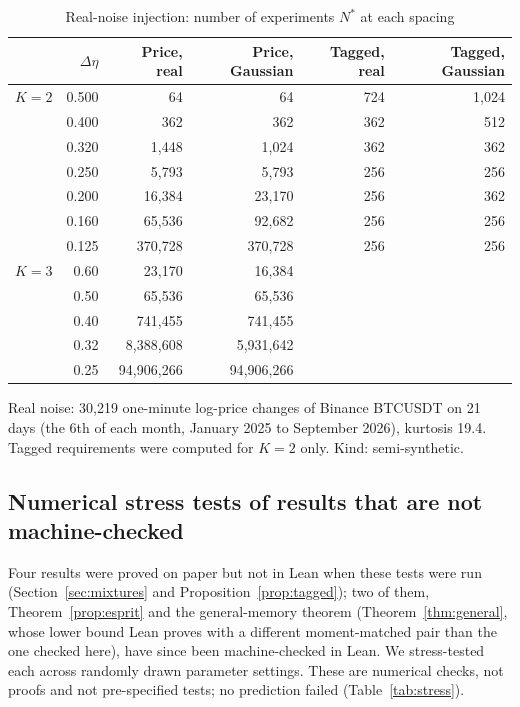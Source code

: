 \begin{table}[!htbp]\centering\small
\begin{threeparttable}
\caption{Real-noise injection: number of experiments $N^*$ at each spacing}\label{tab:injectionfull}
\begin{tabular}{lrrrrr}
\toprule
 & $\Delta\eta$ & Price, real & Price, Gaussian & Tagged, real & Tagged, Gaussian\\
\midrule
$K=2$ & 0.500 & 64 & 64 & 724 & 1{,}024\\
 & 0.400 & 362 & 362 & 362 & 512\\
 & 0.320 & 1{,}448 & 1{,}024 & 362 & 362\\
 & 0.250 & 5{,}793 & 5{,}793 & 256 & 256\\
 & 0.200 & 16{,}384 & 23{,}170 & 256 & 362\\
 & 0.160 & 65{,}536 & 92{,}682 & 256 & 256\\
 & 0.125 & 370{,}728 & 370{,}728 & 256 & 256\\
\midrule
$K=3$ & 0.60 & 23{,}170 & 16{,}384 & & \\
 & 0.50 & 65{,}536 & 65{,}536 & & \\
 & 0.40 & 741{,}455 & 741{,}455 & & \\
 & 0.32 & 8{,}388{,}608 & 5{,}931{,}642 & & \\
 & 0.25 & 94{,}906{,}266 & 94{,}906{,}266 & & \\
\bottomrule
\end{tabular}
\begin{tablenotes}\footnotesize\item Real noise: 30{,}219 one-minute log-price changes of Binance BTCUSDT on 21 days (the 6th of each month, January 2025 to September 2026), kurtosis 19.4. Tagged requirements were computed for $K=2$ only. Kind: semi-synthetic.\end{tablenotes}
\end{threeparttable}
\end{table}

\subsection{Numerical stress tests of results that are not machine-checked}\label{app:stress}

Four results were proved on paper but not in Lean when these tests were run (Section~\ref{sec:mixtures} and Proposition~\ref{prop:tagged}); two of them, Theorem~\ref{prop:esprit} and the general-memory theorem (Theorem~\ref{thm:general}, whose lower bound Lean proves with a different moment-matched pair than the one checked here), have since been machine-checked in Lean. We stress-tested each across randomly drawn parameter settings. These are numerical checks, not proofs and not pre-specified tests; no prediction failed (Table~\ref{tab:stress}).

